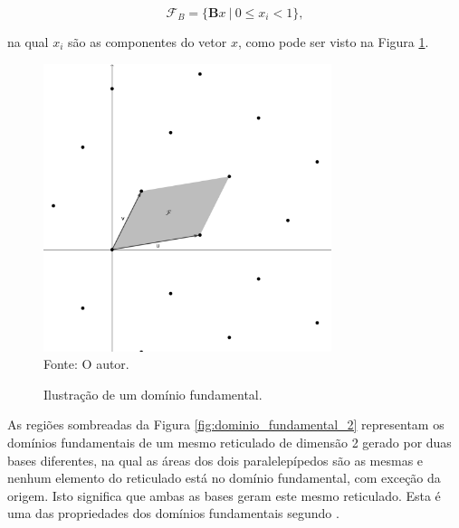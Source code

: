      $$\mathcal{F}_B = \{\textbf{B}x\ |\ 0 \le x_i < 1\},$$

     \noindent
     na qual $x_i$ são as componentes do vetor $x$, como pode ser visto na Figura \ref{fig:dominio_fundamental}. 

     \begin{figure}[htb!]
        \centering
        \caption{Ilustração de um domínio fundamental.}
        \includegraphics[width=0.75\textwidth]{Figuras/dominio_fundamental.png}\\
        \footnotesize{Fonte: O autor.}
        \label{fig:dominio_fundamental}
    \end{figure}

    As regiões sombreadas da Figura \ref{fig:dominio_fundamental_2} representam os domínios fundamentais de um mesmo reticulado de dimensão 2 gerado por duas bases diferentes, na qual as áreas dos dois paralelepípedos são as mesmas e nenhum elemento do reticulado está no domínio fundamental, com exceção da origem. Isto significa que ambas as bases geram este mesmo reticulado. Esta é uma das propriedades dos domínios fundamentais segundo \cite{daniele-lattices}.

